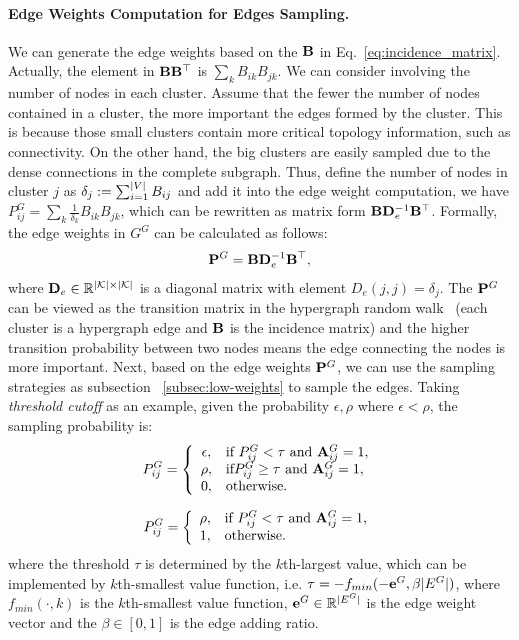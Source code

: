 \paragraph{Edge Weights Computation for Edges Sampling.}
We can generate the edge weights based on the $\mathbf{B}$ in Eq.~\eqref{eq:incidence_matrix}.  Actually, the element in $\mathbf{B}\mathbf{B}^{\top}$ is $\sum_k B_{ik}B_{jk}$. We can consider involving the number of nodes in each cluster. Assume that the fewer the number of nodes contained in a cluster, the more important the edges formed by the cluster. This is because those small clusters contain more critical topology information, such as connectivity. On the other hand, the big clusters are easily sampled due to the dense connections in the complete subgraph. Thus, define the number of nodes in cluster $j$ as  $\delta_j:= \sum_{i=1}^{\mathcal{|}V|} B_{ij}$ and add it into the edge weight computation, we have 
$P^{G}_{ij} = \sum_k \frac{1}{\delta_k} B_{ik}B_{jk}$, which can be rewritten as matrix form $\mathbf B \mathbf{D}_e^{-1} \mathbf{B}^{\top}$. Formally, the edge weights in $G^G$ can be calculated as follows:
\begin{align}
    \mathbf{P}^{G} = \mathbf B \mathbf{D}_e^{-1} \mathbf{B}^{\top},
\end{align}
where  
$\mathbf{D}_e\in\mathbb{R}^{|\mathcal{K}|\times |\mathcal{K}|}$ is a diagonal matrix with element  $D_e{(j,j)} =\delta_j$. 
The $\mathbf{P}^{G}$ can be viewed as the transition matrix in the hypergraph random walk~\cite{zhang2022hypergraph} (each cluster is a hypergraph edge and $\mathbf{B}$ is the incidence matrix) and the higher transition probability between two nodes means the edge connecting the nodes is more important.   
Next, based on the edge weights $\mathbf{P}^{G}$, we can use the  sampling strategies as subsection ~\ref{subsec:low-weights}  to sample the edges. Taking \textit{threshold cutoff} as an example, given the probability $\epsilon, \rho$ where $\epsilon<\rho$, the sampling probability is:
\begin{align}
\label{eq:threshold_cutoff_dropadd}
    P^{G}_{ij}=\left\{\begin{array}{cl}
	\epsilon, & \text{if } P^G_{ij}<\tau \text{ and } \mathbf{A}^G_{ij} =1, \\
    \rho, & \text{if} P^G_{ij}\ge\tau \text{ and } \mathbf{A}^G_{ij}=1, \\
	0, & \text{otherwise.} 
        \end{array}\right.
\end{align}

\begin{align}
\label{eq:threshold_cutoff_dropad}
    P^{G}_{ij}=\left\{\begin{array}{cl}
    \rho, & \text{if } P^G_{ij}<\tau \text{ and } \mathbf{A}^G_{ij}=1, \\
	1, & \text{otherwise.} 
        \end{array}\right.
\end{align}
where the threshold $\tau$ is determined by the $k$th-largest value, which can be implemented by $k$th-smallest value function, i.e.
$\tau = -f_{min}(-\mathbf{e}^{G}, \beta |E^G|)$, where $f_{min}(\cdot,k)$ is the $k$th-smallest value function, $\mathbf{e}^{G} \in \mathbb{R}^{|E^G|}$ is the edge weight vector and the $\beta \in [0,1]$ is the edge adding ratio. 


